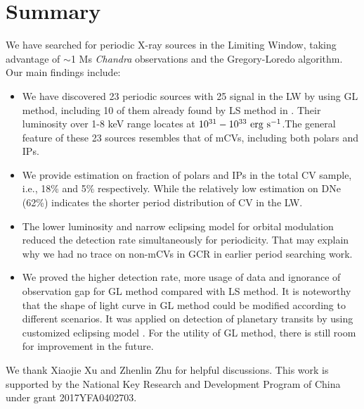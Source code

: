\documentclass[fleqn,usenatbib]{mnras}
\begin{document}
\section{Summary}\label{sec:summary}
We have searched for periodic X-ray sources in the Limiting Window, taking advantage of $\sim$1 Ms {\it Chandra} observations and the Gregory-Loredo algorithm. Our main findings include:

\begin{itemize}
\item We have discovered 23 periodic sources with 25 signal in the LW by using GL method, including 10 of them already found by LS method in \cite{2012ApJ...746..165H}. Their luminosity over 1-8 keV range locates at $\rm 10^{31}-10^{33}~erg~s^{-1} $.The general feature of these 23 sources resembles that of mCVs, including both polars and IPs.


\item We provide estimation on fraction of polars and IPs  in the total CV sample, i.e., 18\% and 5\% respectively. While the relatively low estimation on DNe (62\%) indicates the shorter period distribution of CV in the LW.
 
\item The lower luminosity and narrow eclipsing model for orbital modulation reduced the detection rate simultaneously for periodicity. That may explain why we had no trace on non-mCVs in GCR in earlier period searching work.

\item We proved the higher detection rate, more usage of data and ignorance of observation gap for GL method compared with LS method. It is noteworthy that the shape of light curve in GL method could be modified according to different scenarios. It was applied on detection of planetary transits by using customized eclipsing model \citep{2002A&A...395..625A}. For the utility of GL method, there is still room for improvement in the future.
\end{itemize}
We thank Xiaojie Xu and Zhenlin Zhu for helpful discussions. This work is supported by the National Key Research and Development Program of China under grant 2017YFA0402703.

\end{document}
